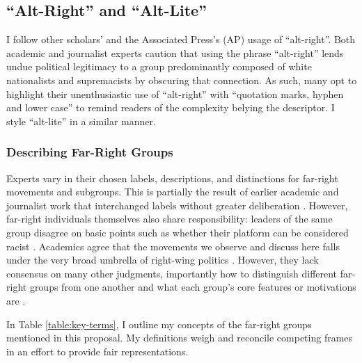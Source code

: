 \documentclass[acmlarge, screen, authorversion]{acmart}
\begin{document}
\subsection{“Alt-Right” and “Alt-Lite”}

I follow other scholars’ \cite{hartzellAltWhiteConceptualizingAltRight, massanariRethinkingResearchEthics2018} and the
Associated Press’s (AP) \cite{johndaniszewskiWritingAltright2016} usage of “alt-right”.
Both academic and journalist experts caution that using the
phrase “alt-right” lends undue political legitimacy to a group predominantly
composed of white nationalists and supremacists by obscuring that
connection. As such, many opt to highlight their unenthusiastic use of
“alt-right” with “quotation marks, hyphen and lower case”
\cite{johndaniszewskiWritingAltright2016} to remind readers of the complexity belying the
descriptor. I style “alt-lite” in a similar manner.

\subsubsection{Describing Far-Right Groups}

Experts vary in their chosen labels, descriptions, and distinctions for far-right movements and
subgroups. This is partially the result of earlier academic and journalist work
that interchanged labels without greater deliberation
\cite{muddeFarRightToday2019}. However,
far-right individuals themselves also share responsibility:
leaders of the same group disagree on basic points
such as whether their platform can be considered racist \cite{muddeFarRightToday2019}.
Academics agree that the movements we observe and discuss here falls under the very broad umbrella of right-wing politics \cite{muddeFarRightToday2019}. However, they lack consensus on many other judgments, importantly how to distinguish different far-right groups from one another and what each group's core features or motivations are \cite{muddeFarRightToday2019}.

In Table \ref{table:key-terms}, I outline my concepts of the far-right groups mentioned in this proposal. My definitions weigh and reconcile competing frames in an effort to provide fair representations.
\end{document}
